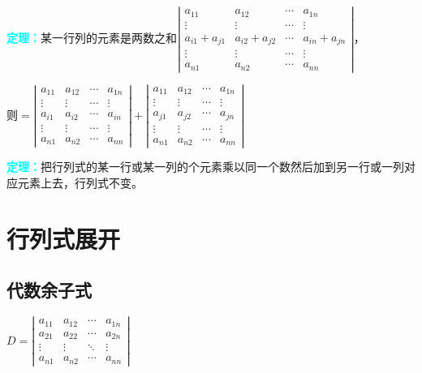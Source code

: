 \documentclass[UTF8, 12pt]{ctexart}
\begin{document}
\textcolor{aqua}{\textbf{定理：}}某一行列的元素是两数之和$
\left|\begin{array}{cccc} 
    a_{11} & a_{12} & \cdots & a_{1n} \\
    \vdots & \vdots & \cdots & \vdots \\
    a_{i1}+a_{j1} & a_{i2}+a_{j2} & \cdots & a_{in}+a_{jn} \\
    \vdots & \vdots & \cdots & \vdots \\
    a_{n1} & a_{n2} & \cdots & a_{nn}
\end{array}\right| 
$，

则$=\left|\begin{array}{cccc} 
    a_{11} & a_{12} & \cdots & a_{1n} \\
    \vdots & \vdots & \cdots & \vdots \\
    a_{i1} & a_{i2} & \cdots & a_{in}\\
    \vdots & \vdots & \cdots & \vdots \\
    a_{n1} & a_{n2} & \cdots & a_{nn}
\end{array}\right|+
\left|\begin{array}{cccc} 
    a_{11} & a_{12} & \cdots & a_{1n} \\
    \vdots & \vdots & \cdots & \vdots \\
    a_{j1} & a_{j2} & \cdots & a_{jn} \\
    \vdots & \vdots & \cdots & \vdots \\
    a_{n1} & a_{n2} & \cdots & a_{nn}
\end{array}\right|$

\textcolor{aqua}{\textbf{定理：}}把行列式的某一行或某一列的个元素乘以同一个数然后加到另一行或一列对应元素上去，行列式不变。

\section{行列式展开}

\subsection{代数余子式}

$
D=\left|\begin{array}{cccc} 
    a_{11} & a_{12} & \cdots & a_{1n} \\
    a_{21} & a_{22} & \cdots & a_{2n} \\
    \vdots & \vdots & \ddots & \vdots \\
    a_{n1} & a_{n2} & \cdots & a_{nn}
\end{array}\right|
$
\end{document}

